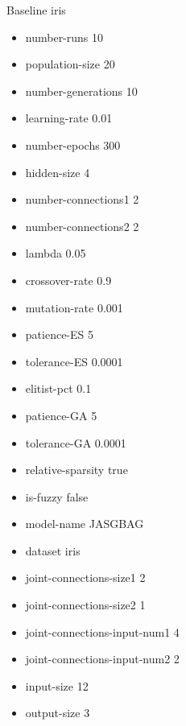 Baseline
iris
\begin{itemize}
\item number-runs 10
\item population-size 20
\item number-generations 10
\item learning-rate 0.01
\item number-epochs 300
\item hidden-size 4
\item number-connections1 2
\item number-connections2 2
\item lambda 0.05
\item crossover-rate 0.9
\item mutation-rate 0.001
\item patience-ES 5
\item tolerance-ES 0.0001
\item elitist-pct 0.1
\item patience-GA 5
\item tolerance-GA 0.0001
\item relative-sparsity true
\item is-fuzzy false
\item model-name JASGBAG
\item dataset iris
\item joint-connections-size1 2
\item joint-connections-size2 1
\item joint-connections-input-num1 4
\item joint-connections-input-num2 2
\item input-size 12
\item output-size 3
\end{itemize}

